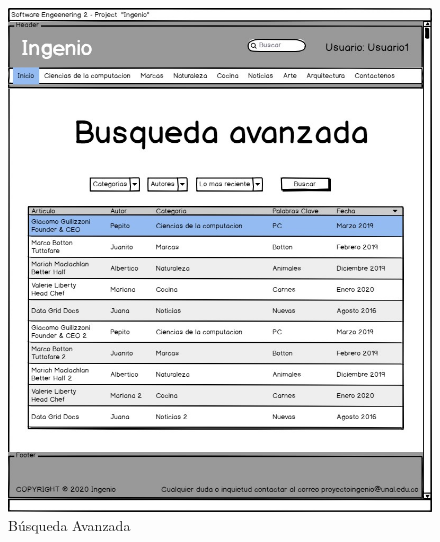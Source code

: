 \documentclass[a4paper,12 pt]{article}
\begin{document}
\begin{figure}[H]
    \centering
    \includegraphics[scale = 0.7]{images/BusquedaAvanzada.jpg}
    \caption{Búsqueda Avanzada}
    \label{F104}
\end{figure}{}
\end{document}
